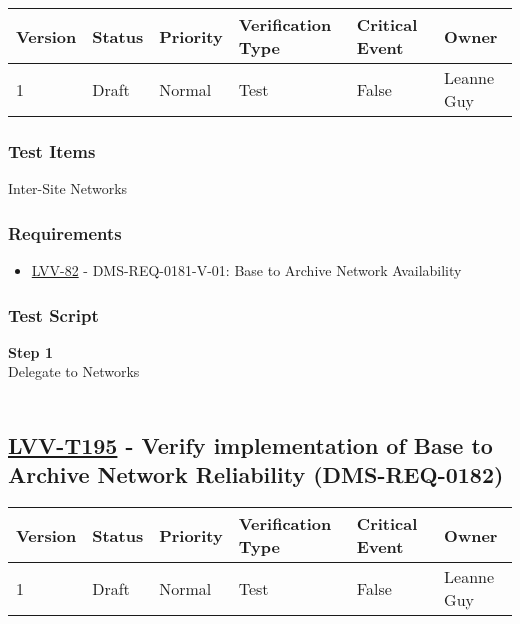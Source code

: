 \begin{longtable}[]{@{}llllll@{}}
\toprule
Version & Status & Priority & Verification Type & Critical Event &
Owner\tabularnewline
\midrule
\endhead
1 & Draft & Normal & Test & False & Leanne Guy\tabularnewline
\bottomrule
\end{longtable}

\hypertarget{test-items-170}{%
\subsubsection{Test Items}\label{test-items-170}}

Inter-Site Networks~

\hypertarget{requirements-171}{%
\subsubsection{Requirements}\label{requirements-171}}

\begin{itemize}
\tightlist
\item
  \href{https://jira.lsstcorp.org/browse/LVV-82}{LVV-82} -
  DMS-REQ-0181-V-01: Base to Archive Network Availability
\end{itemize}

\hypertarget{test-script-171}{%
\subsubsection{Test Script}\label{test-script-171}}

\textbf{Step 1}\\
Delegate to Networks\\
~\\

\hypertarget{lvv-t195---verify-implementation-of-base-to-archive-network-reliability-dms-req-0182}{%
\subsection{\texorpdfstring{\href{https://jira.lsstcorp.org/secure/Tests.jspa\#/testCase/LVV-T195}{LVV-T195}
- Verify implementation of Base to Archive Network Reliability
(DMS-REQ-0182)}{LVV-T195 - Verify implementation of Base to Archive Network Reliability (DMS-REQ-0182)}}\label{lvv-t195---verify-implementation-of-base-to-archive-network-reliability-dms-req-0182}}

\begin{longtable}[]{@{}llllll@{}}
\toprule
Version & Status & Priority & Verification Type & Critical Event &
Owner\tabularnewline
\midrule
\endhead
1 & Draft & Normal & Test & False & Leanne Guy\tabularnewline
\bottomrule
\end{longtable}

